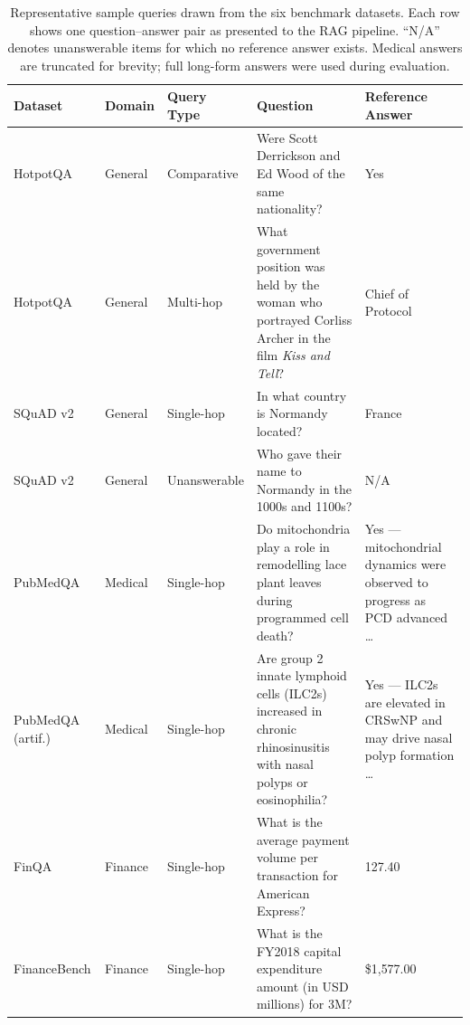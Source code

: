 \documentclass[12pt]{article}
\begin{document}
\begin{table}[h]
\centering
\caption{Representative sample queries drawn from the six benchmark datasets.
Each row shows one question--answer pair as presented to the RAG pipeline.
``N/A'' denotes unanswerable items for which no reference answer exists.
Medical answers are truncated for brevity; full long-form answers were used
during evaluation.}
\label{tab:sample_queries}
\small
\begin{tabular}{p{2.2cm} l p{1.8cm} p{5.5cm} p{2.8cm}}
\toprule
\textbf{Dataset} & \textbf{Domain} & \textbf{Query Type} & \textbf{Question} & \textbf{Reference Answer} \\
\midrule

HotpotQA
  & General
  & Comparative
  & Were Scott Derrickson and Ed Wood of the same nationality?
  & Yes \\[4pt]

HotpotQA
  & General
  & Multi-hop
  & What government position was held by the woman who portrayed Corliss Archer in the film \textit{Kiss and Tell}?
  & Chief of Protocol \\[4pt]

SQuAD v2
  & General
  & Single-hop
  & In what country is Normandy located?
  & France \\[4pt]

SQuAD v2
  & General
  & Unanswerable
  & Who gave their name to Normandy in the 1000s and 1100s?
  & N/A \\[4pt]

PubMedQA
  & Medical
  & Single-hop
  & Do mitochondria play a role in remodelling lace plant leaves during programmed cell death?
  & Yes --- mitochondrial dynamics were observed to progress as PCD advanced \ldots \\[4pt]

PubMedQA (artif.)
  & Medical
  & Single-hop
  & Are group 2 innate lymphoid cells (ILC2s) increased in chronic rhinosinusitis with nasal polyps or eosinophilia?
  & Yes --- ILC2s are elevated in CRSwNP and may drive nasal polyp formation \ldots \\[4pt]

FinQA
  & Finance
  & Single-hop
  & What is the average payment volume per transaction for American Express?
  & 127.40 \\[4pt]

FinanceBench
  & Finance
  & Single-hop
  & What is the FY2018 capital expenditure amount (in USD millions) for 3M?
  & \$1{,}577.00 \\

\bottomrule
\end{tabular}
\end{table}
 
\end{document}

